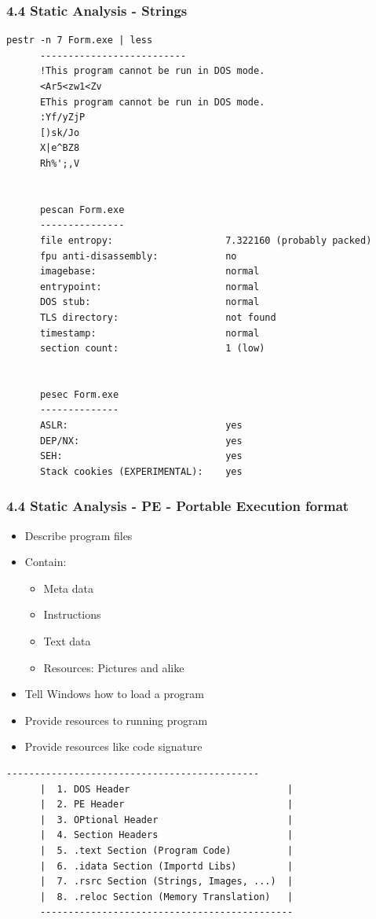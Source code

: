 \begin{frame}[fragile]
  \frametitle{4.4 Static Analysis - Strings}
  \begin{lstlisting}[basicstyle=\tiny]
      pestr -n 7 Form.exe | less
      --------------------------
      !This program cannot be run in DOS mode.
      <Ar5<zw1<Zv
      EThis program cannot be run in DOS mode.
      :Yf/yZjP
      [)sk/Jo
      X|e^BZ8
      Rh%';,V


      pescan Form.exe
      ---------------
      file entropy:                    7.322160 (probably packed)
      fpu anti-disassembly:            no
      imagebase:                       normal
      entrypoint:                      normal
      DOS stub:                        normal
      TLS directory:                   not found
      timestamp:                       normal
      section count:                   1 (low)


      pesec Form.exe
      --------------
      ASLR:                            yes
      DEP/NX:                          yes
      SEH:                             yes
      Stack cookies (EXPERIMENTAL):    yes
  \end{lstlisting}
\end{frame}


\begin{frame}[fragile]
  \frametitle{4.4 Static Analysis - PE - Portable Execution format}
    \begin{itemize}
        \item Describe program files
        \item Contain:
        \begin{itemize}
            \item Meta data
            \item Instructions
            \item Text data
            \item Resources: Pictures and alike
        \end{itemize}
        \item Tell Windows how to load a program
        \item Provide resources to running program
        \item Provide resources like code signature
    \end{itemize}
  \begin{lstlisting}[basicstyle=\tiny]
      ---------------------------------------------
      |  1. DOS Header                            |
      |  2. PE Header                             |
      |  3. OPtional Header                       |
      |  4. Section Headers                       |
      |  5. .text Section (Program Code)          |
      |  6. .idata Section (Importd Libs)         |
      |  7. .rsrc Section (Strings, Images, ...)  |
      |  8. .reloc Section (Memory Translation)   |
      ---------------------------------------------
  \end{lstlisting}
\end{frame}


